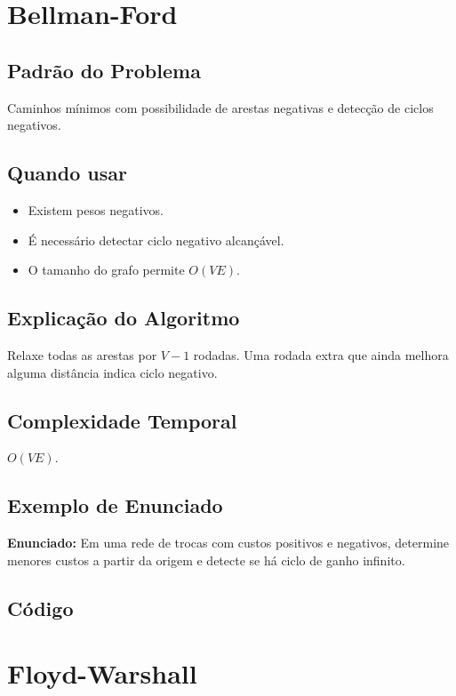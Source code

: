 \section{Bellman-Ford}

\subsection{Padrão do Problema}
Caminhos mínimos com possibilidade de arestas negativas e detecção de ciclos negativos.

\subsection{Quando usar}
\begin{itemize}[nosep]
  \item Existem pesos negativos.
  \item É necessário detectar ciclo negativo alcançável.
  \item O tamanho do grafo permite $O(VE)$.
\end{itemize}

\subsection{Explicação do Algoritmo}
Relaxe todas as arestas por $V-1$ rodadas. Uma rodada extra que ainda melhora alguma distância indica ciclo negativo.

\subsection{Complexidade Temporal}
$O(VE)$.

\subsection{Exemplo de Enunciado}
\begin{exemplodiabox}
\textbf{Enunciado:} Em uma rede de trocas com custos positivos e negativos, determine menores custos a partir da origem e detecte se há ciclo de ganho infinito.
\end{exemplodiabox}

\subsection{Código}

\section{Floyd-Warshall}

